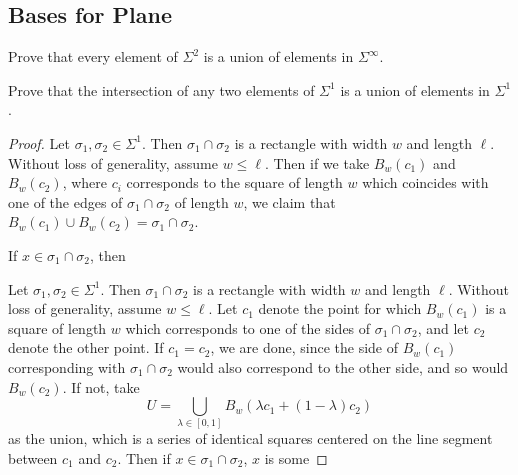 \subsection{Bases for Plane}

\begin{minorEx}
    Prove that every element of $\Sigma^2$ is a union of elements in
    $\Sigma^\infty$.
\end{minorEx}

\begin{minorEx}
    Prove that the intersection of any two elements of $\Sigma^1$ is a union of
    elements in $\Sigma^1$.
\end{minorEx}

\begin{proof}
    Let $\sigma_1, \sigma_2 \in \Sigma^1$. Then $\sigma_1 \cap \sigma_2$ is a
    rectangle with width $w$ and length $\ell$. Without loss of generality,
    assume $w \leq \ell$. Then if we take $B_w(c_1)$ and $B_w(c_2)$, where $c_i$
    corresponds to the square of length $w$ which coincides with one of the
    edges of $\sigma_1 \cap \sigma_2$ of length $w$, we claim that $B_w(c_1)
    \cup B_w(c_2) = \sigma_1 \cap \sigma_2$.

    If $x \in \sigma_1 \cap \sigma_2$, then


    Let $\sigma_1, \sigma_2 \in \Sigma^1$. Then $\sigma_1 \cap \sigma_2$ is a
    rectangle with width $w$ and length $\ell$. Without loss of generality,
    assume $w \leq \ell$. Let $c_1$ denote the point for which $B_w(c_1)$
    is a square of length $w$ which corresponds to one of the sides of $\sigma_1
    \cap \sigma_2$, and let $c_2$ denote the other point. If $c_1 = c_2$, we are
    done, since the side of $B_w(c_1)$ corresponding with $\sigma_1 \cap
    \sigma_2$ would also correspond to the other side, and so would $B_w(c_2)$. 
    If not, take
    \[
        U = \bigcup_{\lambda \in [0,1]} B_w(\lambda c_1 + (1 - \lambda) c_2)
    \]
    as the union, which is a series of identical squares centered on the line
    segment between $c_1$ and $c_2$. Then if $x \in \sigma_1 \cap \sigma_2$, $x$
    is some 
\end{proof}

